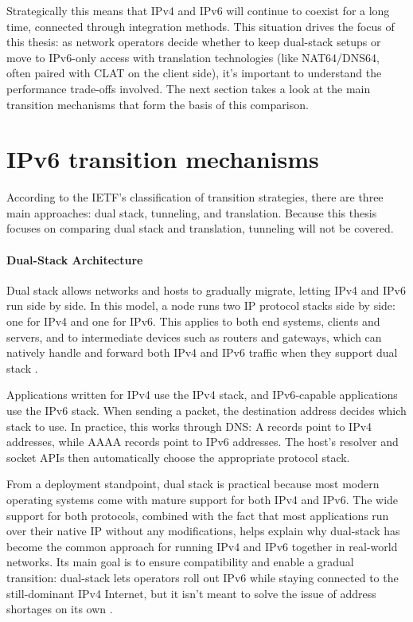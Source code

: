 Strategically this means that IPv4 and IPv6 will continue to coexist for a long time, connected through integration methods\cite{7737362,LEVIN20141059}. This situation drives the focus of this thesis: as network operators decide whether to keep dual-stack setups or move to IPv6-only access with translation technologies (like NAT64/DNS64, often paired with CLAT on the client side), it's important to understand the performance trade-offs involved. The next section takes a look at the main transition mechanisms that form the basis of this comparison\cite{7737362,LEVIN20141059}.

\section{IPv6 transition mechanisms}
According to the IETF’s classification of transition strategies, there are three main approaches: 
dual stack, tunneling, and translation\cite{rfc2893}. Because this thesis focuses on comparing dual stack and translation, tunneling will not be covered. 

\paragraph{Dual-Stack Architecture} 

Dual stack allows networks and hosts to gradually migrate, letting IPv4 and IPv6 run side by side\cite{punithavathani2009ipv4}. In this model, a node runs two IP protocol stacks side by side: one for IPv4 and one for IPv6. This applies to both end systems, clients and servers, and to intermediate devices such as routers and gateways, which can natively handle and forward both IPv4 and IPv6 traffic when they support dual stack \cite{punithavathani2009ipv4}.

Applications written for IPv4 use the IPv4 stack, and IPv6‑capable applications use the IPv6 stack. When sending a packet, the destination address decides which stack to use\cite{rfc4213}. In practice, this works through DNS: A records point to IPv4 addresses, while AAAA records point to IPv6 addresses. The host’s resolver and socket APIs then automatically choose the appropriate protocol stack\cite{punithavathani2009ipv4}.

From a deployment standpoint, dual stack is practical because most modern operating systems come with mature support for both IPv4 and IPv6\cite{rfc7381}. The wide support for both protocols, combined with the fact that most applications run over their native IP without any modifications, helps explain why dual-stack has become the common approach for running IPv4 and IPv6 together in real-world networks\cite{punithavathani2009ipv4}. Its main goal is to ensure compatibility and enable a gradual transition: dual-stack lets operators roll out IPv6 while staying connected to the still-dominant IPv4 Internet, but it isn’t meant to solve the issue of address shortages on its own \cite{LEVIN20141059}.

